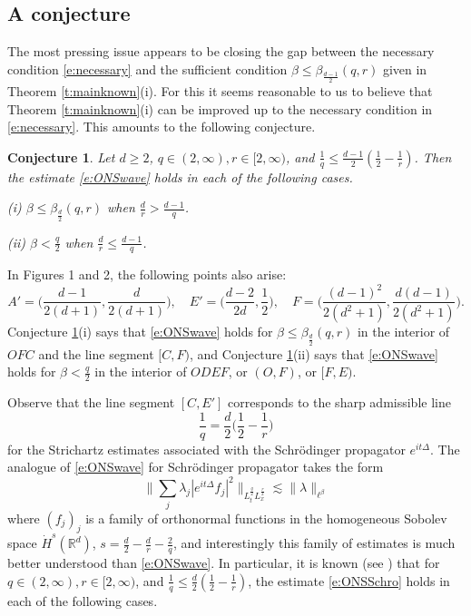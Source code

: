 \documentclass[a4paper]{amsart}
\numberwithin{equation}{section}%
\theoremstyle{plain}%
\newtheorem{conj}[theorem]{Conjecture}
\theoremstyle{definition}
\theoremstyle{remark}%
\begin{document}
\subsection{A conjecture} 
The most pressing issue appears to be closing the gap between the necessary condition \eqref{e:necessary} and the sufficient condition $\beta \leq \beta_{\frac{d-1}{2}}(q,r)$ given in Theorem \ref{t:mainknown}(i). For this it seems reasonable to us to believe that Theorem \ref{t:mainknown}(i) can be improved up to the necessary condition in \eqref{e:necessary}. This amounts to the following conjecture.
\begin{conj} \label{conj:main}
Let $d \geq 2$, $q \in (2,\infty), r \in [2,\infty)$, and $\frac{1}{q} \leq \frac{d-1}{2}(\frac{1}{2} - \frac{1}{r})$. Then the estimate \eqref{e:ONSwave} holds in each of the following cases.

\emph{(i)} $\beta \leq \beta_{\frac{d}{2}}(q,r)$ when $\frac{d}{r} > \frac{d-1}{q}$.

\emph{(ii)} $\beta < \frac{q}{2}$ when $\frac{d}{r} \leq \frac{d-1}{q}$.
\end{conj}
In Figures 1 and 2, the following points also arise:
\[
A' = \bigg(\frac{d-1}{2(d+1)},\frac{d}{2(d+1)}\bigg), \quad E' = \bigg(\frac{d-2}{2d},\frac{1}{2}\bigg), \quad F = \bigg(\frac{(d-1)^2}{2(d^2+1)},\frac{d(d-1)}{2(d^2+1)}\bigg).
\]
Conjecture \ref{conj:main}(i) says that \eqref{e:ONSwave} holds for $\beta \leq \beta_{\frac{d}{2}}(q,r)$ in the interior of $OFC$ and the line segment $[C,F)$, and Conjecture \ref{conj:main}(ii) says that \eqref{e:ONSwave} holds for $\beta < \frac{q}{2}$ in the interior of $ODEF$, or $(O,F)$, or $[F,E)$.

Observe that the line segment $[C,E']$ corresponds to the sharp admissible line
\[
\frac{1}{q} = \frac{d}{2}\bigg(\frac{1}{2} - \frac{1}{r}\bigg)
\]
for the Strichartz estimates associated with the Schr\"odinger propagator $e^{it\Delta}$. The analogue of \eqref{e:ONSwave} for Schr\"odinger propagator takes the form
\begin{equation} \label{e:ONSSchro}
\bigg\| \sum_j \lambda_j |e^{it\Delta}f_j|^2 \bigg\|_{L^{\frac{q}{2}}_tL^\frac{r}{2}_x} \lesssim \| \lambda \|_{\ell^\beta}
\end{equation}
where $(f_j)_j$ is a family of orthonormal functions in the homogeneous Sobolev space $\dot{H}^{s}(\mathbb{R}^d)$, $s = \frac{d}{2} - \frac{d}{r} - \frac{2}{q}$, and interestingly this family of estimates is much better understood than \eqref{e:ONSwave}. In particular, it is known (see \cite{FLLS, FS_AJM, FS_Survey, BHLNS}) that for $q \in (2,\infty), r \in [2,\infty)$, and $\frac{1}{q} \leq \frac{d}{2}(\frac{1}{2} - \frac{1}{r})$, the estimate \eqref{e:ONSSchro} holds in each of the following cases.
\end{document}

